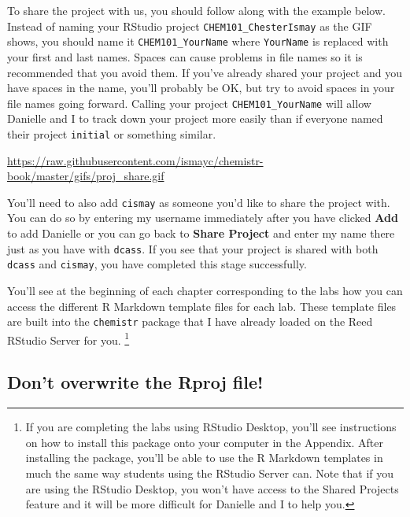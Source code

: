 \documentclass[]{tufte-book}
\begin{document}
To share the project with us, you should follow along with the example
below. Instead of naming your RStudio project
\texttt{CHEM101\_ChesterIsmay} as the GIF shows, you should name it
\texttt{CHEM101\_YourName} where \texttt{YourName} is replaced with your
first and last names. Spaces can cause problems in file names so it is
recommended that you avoid them. If you've already shared your project
and you have spaces in the name, you'll probably be OK, but try to avoid
spaces in your file names going forward. Calling your project
\texttt{CHEM101\_YourName} will allow Danielle and I to track down your
project more easily than if everyone named their project
\texttt{initial} or something similar.

\vspace{0.1in}

\begin{center}\footnotesize{\url{https://raw.githubusercontent.com/ismayc/chemistr-book/master/gifs/proj_share.gif}}\end{center}

\vspace{0.1in}

You'll need to also add \texttt{cismay} as someone you'd like to share
the project with. You can do so by entering my username immediately
after you have clicked \textbf{Add} to add Danielle or you can go back
to \textbf{Share Project} and enter my name there just as you have with
\texttt{dcass}. If you see that your project is shared with both
\texttt{dcass} and \texttt{cismay}, you have completed this stage
successfully.

You'll see at the beginning of each chapter corresponding to the labs
how you can access the different R Markdown template files for each lab.
These template files are built into the \texttt{chemistr} package that I
have already loaded on the Reed RStudio Server for you. \footnote{If you
  are completing the labs using RStudio Desktop, you'll see instructions
  on how to install this package onto your computer in the Appendix.
  After installing the package, you'll be able to use the R Markdown
  templates in much the same way students using the RStudio Server can.
  Note that if you are using the RStudio Desktop, you won't have access
  to the Shared Projects feature and it will be more difficult for
  Danielle and I to help you.}

\subsection*{Don't overwrite the Rproj
file!}\label{dont-overwrite-the-rproj-file}
\end{document}
